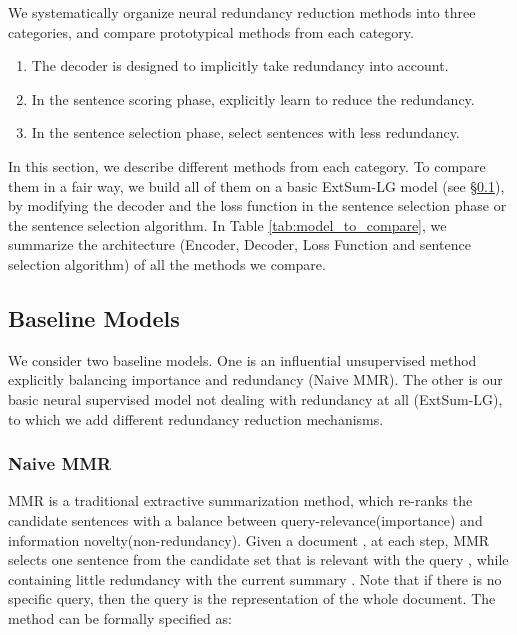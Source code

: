 \documentclass[11pt,a4paper]{article}
\begin{document}
We systematically organize neural redundancy reduction methods into three categories, and compare prototypical methods from each category.
\vspace{-1mm}
\renewcommand{\labelenumi}{\Alph{enumi}}
\begin{enumerate}

    \item The decoder is designed to implicitly take redundancy into account.
\item In the sentence scoring phase, explicitly learn to reduce the redundancy.
\item In the sentence selection phase, select sentences with less redundancy.
\end{enumerate}
\vspace{-1mm}


In this section, we describe different methods from each category. To compare them in a fair way, we build all of them on a basic ExtSum-LG model (see  \S\ref{basic-model}), by modifying the decoder and the loss function in the sentence selection phase or the sentence selection algorithm. In Table \ref{tab:model_to_compare}, we summarize the architecture (Encoder, Decoder, Loss Function and sentence selection algorithm) of all the methods we compare.

\subsection{Baseline Models}
\label{basic-model}
We consider two baseline models. One is an influential unsupervised method explicitly balancing importance and  redundancy (Naive MMR). The other is our basic neural supervised model not dealing with redundancy at all (ExtSum-LG), to which we add different redundancy reduction mechanisms.

\subsubsection*{Naive MMR}
MMR \cite{mmr} is a traditional extractive summarization method, which re-ranks the candidate sentences with a balance between query-relevance(importance) and information novelty(non-redundancy).
Given a document , at each step, MMR selects one sentence from the candidate set  that is relevant with the query , while containing little redundancy with the current summary . Note that if there is no specific query, then the query is the representation of the whole document. The method can be formally specified as:
\vspace{-2mm}
\end{document}
